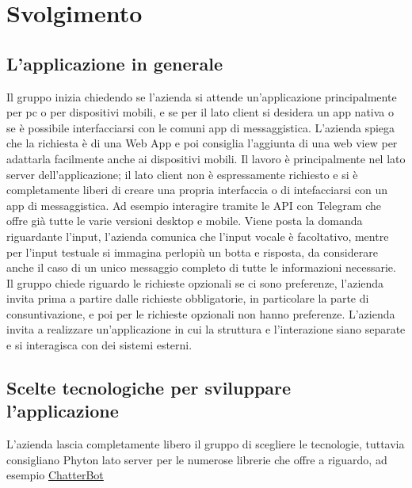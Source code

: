 \section{Svolgimento}
\subsection{L'applicazione in generale}
Il gruppo inizia chiedendo se l'azienda si attende un'applicazione principalmente 
per pc o per dispositivi mobili, e se per il lato client si desidera un app nativa 
o se è possibile interfacciarsi con le comuni app di messaggistica. \newline
L'azienda spiega che la richiesta è di una Web App e poi consiglia l'aggiunta di una 
web view per adattarla facilmente anche ai dispositivi mobili. Il lavoro è principalmente 
nel lato server dell'applicazione; il lato client non è espressamente richiesto e si è 
completamente liberi di creare una propria interfaccia o di intefacciarsi con un app di 
messaggistica. Ad esempio interagire tramite le API con Telegram che offre già tutte 
le varie versioni desktop e mobile.\newline
Viene posta la domanda riguardante l'input, l'azienda comunica che l'input vocale 
è facoltativo, mentre per l'input testuale si immagina perlopiù un botta e risposta, 
da considerare anche il caso di un unico messaggio completo di tutte le informazioni necessarie.\newline
Il gruppo chiede riguardo le richieste opzionali se ci sono preferenze, l'azienda invita 
prima a partire dalle richieste obbligatorie, in particolare la parte di consuntivazione, 
e poi per le richieste opzionali non hanno preferenze.
L'azienda invita a realizzare un'applicazione in cui la struttura e l'interazione siano
separate e si interagisca con dei sistemi esterni.

\subsection{Scelte tecnologiche per sviluppare l'applicazione}
L'azienda lascia completamente libero il gruppo di scegliere le tecnologie, tuttavia 
consigliano Phyton lato server per le numerose librerie che offre a riguardo, 
ad esempio \href{https://chatterbot.readthedocs.io/en/stable/}{ChatterBot}

